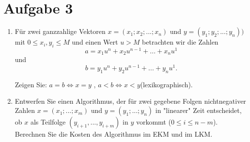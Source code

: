 \documentclass[11pt,a4paper,ngerman]{article}
\begin{document}

\section*{Aufgabe 3}

\begin{enumerate}[\bfseries (a)]

\item Für zwei ganzzahlige Vektoren $x=(x_1; x_2; ...; x_n)$ und $y=(y_1; y_2; ...; y_n))$ mit $0\leq x_i, y_i \leq M$ und einen Wert $u > M$ betrachten wir die Zahlen
$$
a = x_1 u^n + x_2 u^{n-1}+ ... + x_n u^1
$$
und
$$
b=y_1u^n + y_2 u^{n-1} + ... + y_n u^1.
$$

Zeigen Sie: $a=b \Leftrightarrow x=y$ , $a<b \Leftrightarrow x < y$(lexikographisch).


\item Entwerfen Sie einen Algorithmus, der für zwei gegebene Folgen nichtnegativer Zahlen $x=(x_1; ... ; x_m)$ und $y=(y_1; ...; y_n)$ in "linearer" Zeit entscheidet, ob $x$ als Teilfolge $(y_{i+1},...,y_{i+m})$ in $y$ vorkommt ($0 \leq i \leq n-m$). Berechnen Sie die Kosten des Algorithmus im EKM und im LKM.


\end{enumerate}
\label{LastPage}
\end{document}
